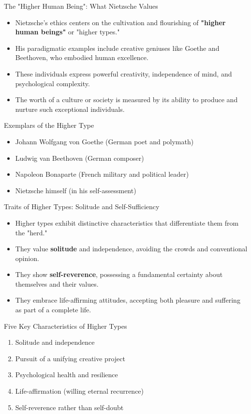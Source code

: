\documentclass{beamer}
\begin{document}
\begin{frame}{The "Higher Human Being": What Nietzsche Values}
\begin{itemize}
\item Nietzsche's ethics centers on the cultivation and flourishing of \textbf{"higher human beings"} or "higher types."
\item His paradigmatic examples include creative geniuses like Goethe and Beethoven, who embodied human excellence.
\item These individuals express powerful creativity, independence of mind, and psychological complexity.
\item The worth of a culture or society is measured by its ability to produce and nurture such exceptional individuals.
\end{itemize}

\begin{exampleblock}{Exemplars of the Higher Type}
\begin{itemize}
\item Johann Wolfgang von Goethe (German poet and polymath)
\item Ludwig van Beethoven (German composer)
\item Napoleon Bonaparte (French military and political leader)
\item Nietzsche himself (in his self-assessment)
\end{itemize}
\end{exampleblock}
\end{frame}

\begin{frame}{Traits of Higher Types: Solitude and Self-Sufficiency}
\begin{itemize}
\item Higher types exhibit distinctive characteristics that differentiate them from the "herd."
\item They value \textbf{solitude} and independence, avoiding the crowds and conventional opinion.
\item They show \textbf{self-reverence}, possessing a fundamental certainty about themselves and their values.
\item They embrace life-affirming attitudes, accepting both pleasure and suffering as part of a complete life.
\end{itemize}

\begin{alertblock}{Five Key Characteristics of Higher Types}
\begin{enumerate}
\item Solitude and independence
\item Pursuit of a unifying creative project
\item Psychological health and resilience
\item Life-affirmation (willing eternal recurrence)
\item Self-reverence rather than self-doubt
\end{enumerate}
\end{alertblock}
\end{frame}
\end{document}

